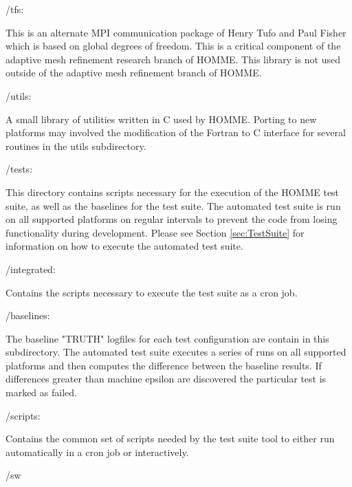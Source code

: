 \documentclass[12pt]{article}
\numberwithin{equation}{section}
\begin{document}
\begin{list}
\begin{list} {\setlength{\rightmargin}{\leftmargin}}
		\item /tfs:
			
			This is an alternate MPI communication package of Henry Tufo and Paul Fisher  which is based on global degrees of freedom.  This is a critical component of the adaptive mesh refinement research branch of HOMME.  This library is not used outside of the adaptive mesh refinement branch of HOMME.
			
		\item /utils:
		
			A small library of utilities written in C used by HOMME.  Porting to new platforms may involved the modification of the Fortran to C interface for several routines in the utils subdirectory.  

	\end{list}
	
	\item /tests:
	
		This directory contains scripts necessary for the execution of the HOMME test suite, as well as the baselines for the test suite.  The automated test suite is run on all supported platforms on regular intervals to prevent the code from losing functionality during development. Please see Section \ref{sec:TestSuite} for information on how to execute the automated test suite.  
	
		\begin{list} {\setlength{\rightmargin}{\leftmargin}}
		\item /integrated:
			
			Contains the scripts necessary to execute the test suite as a cron job. 
			
		\item /baselines:
		
			The baseline "TRUTH" logfiles for each test configuration are contain in this subdirectory.  The automated test suite executes a series of runs on all supported platforms and then computes the difference between the baseline results.  If differences greater than machine epsilon are discovered the particular test is marked as failed. 
			
		\item /scripts:
		
			Contains the common set of scripts needed by the test suite tool to either run automatically in a cron job or interactively.  
			
		\end{list}
		
		\item  /sw
		

\end{list}
\end{document}
